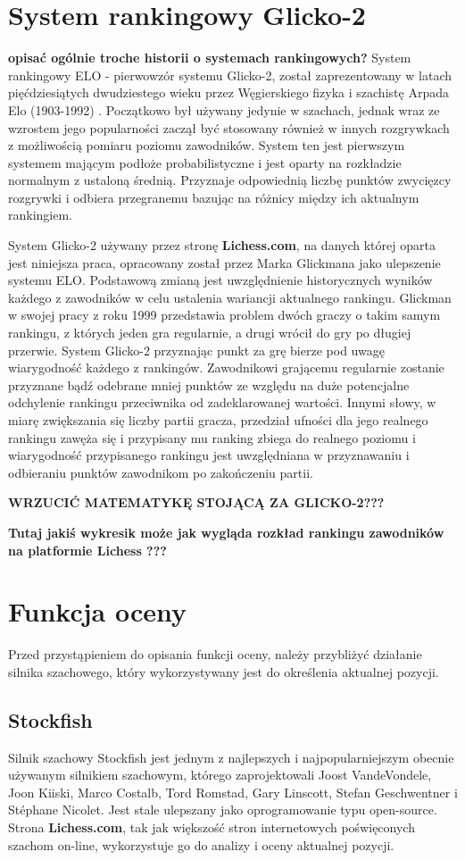 \documentclass[inzynierska]{pwr_wmat_praca_dyplomowa}
\theoremstyle{plain}
\numberwithin{theorem}{chapter}
\theoremstyle{definition}
\numberwithin{theorem}{chapter}
\begin{document}
\section{System rankingowy Glicko-2}
\textbf{opisać ogólnie troche historii o systemach rankingowych?}
System rankingowy ELO - pierwowzór systemu Glicko-2, został zaprezentowany w latach pięćdziesiątych dwudziestego wieku przez Węgierskiego fizyka i szachistę Arpada Elo (1903-1992) \textbf{\cite[rozdział 1]{elo}}. Początkowo był używany jedynie w szachach, jednak wraz ze wzrostem jego popularności zaczął być stosowany również w innych rozgrywkach z możliwością pomiaru poziomu zawodników. System ten jest pierwszym systemem mającym podłoże probabilistyczne i jest oparty na rozkładzie normalnym z ustaloną średnią. Przyznaje odpowiednią liczbę punktów zwycięzcy rozgrywki i odbiera przegranemu bazując na różnicy między ich aktualnym rankingiem.


System Glicko-2  używany przez stronę \textbf{Lichess.com}, na danych której oparta jest niniejsza praca, opracowany został przez Marka Glickmana jako ulepszenie systemu ELO. Podstawową zmianą jest uwzględnienie historycznych wyników każdego z zawodników w celu ustalenia wariancji aktualnego rankingu. Glickman w swojej pracy z roku 1999 \textbf{\cite{glicko}} przedstawia problem dwóch graczy o takim samym rankingu, z których jeden gra regularnie, a drugi wrócił do gry po długiej przerwie. System Glicko-2 przyznając punkt za grę bierze pod uwagę wiarygodność każdego z rankingów. Zawodnikowi grającemu regularnie zostanie przyznane bądź odebrane mniej punktów ze względu na duże potencjalne odchylenie rankingu przeciwnika od zadeklarowanej wartości. Innymi słowy, w miarę zwiększania się liczby partii gracza, przedział ufności dla jego realnego rankingu zawęża się i przypisany mu ranking zbiega do realnego poziomu i wiarygodność przypisanego rankingu jest uwzględniana w przyznawaniu i odbieraniu punktów zawodnikom po zakończeniu partii.

\textbf{WRZUCIĆ MATEMATYKĘ STOJĄCĄ ZA GLICKO-2???}

\textbf{Tutaj jakiś wykresik może jak wygląda rozkład rankingu zawodników na platformie Lichess ???}
\section{Funkcja oceny}
Przed przystąpieniem do opisania funkcji oceny, należy przybliżyć działanie silnika szachowego, który wykorzystywany jest do określenia aktualnej pozycji.
\subsection{Stockfish}
Silnik szachowy Stockfish \textbf{\cite{stockfish}} jest jednym z najlepszych i najpopularniejszym obecnie używanym silnikiem szachowym, którego zaprojektowali Joost VandeVondele, Joon Kiiski, Marco Costalb, Tord Romstad, Gary Linscott, Stefan Geschwentner i Stéphane Nicolet. Jest stale ulepszany jako oprogramowanie typu open-source. Strona \textbf{Lichess.com}, tak jak większość stron internetowych poświęconych szachom on-line, wykorzystuje go \textbf{\cite{stockfish_lichess}} do analizy i oceny aktualnej pozycji.
\end{document}
